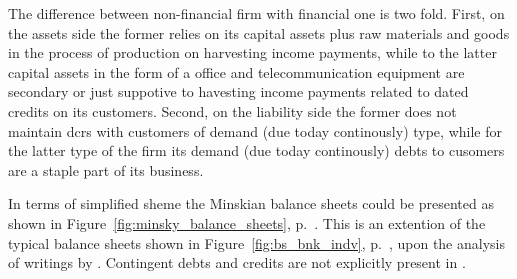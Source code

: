 The difference between non-financial firm with financial one is two fold. First, on the assets side the former relies on its capital assets plus raw materials and goods in the process of production on harvesting income payments, while to the latter capital assets in the form of a office and telecommunication equipment are secondary or just suppotive to havesting income payments related to dated credits on its customers. Second, on the liability side the former does not maintain \acfp{dcr} with customers of demand (due today continously) type, while for the latter type of the firm its demand (due today continously) debts to cusomers are a staple part of its business.

In terms of simplified sheme the Minskian balance sheets could be presented as shown in Figure~\ref{fig:minsky_balance_sheets}, p.~\pageref{fig:minsky_balance_sheets}. This is an extention of the typical balance sheets shown in Figure~\ref{fig:bs_bnk_indv}, p.~\pageref{fig:bs_bnk_indv}, upon the analysis of writings by \citeauthor{innes1913}. Contingent debts and credits are not explicitly present in \citep{innes1913,innes1914}.

